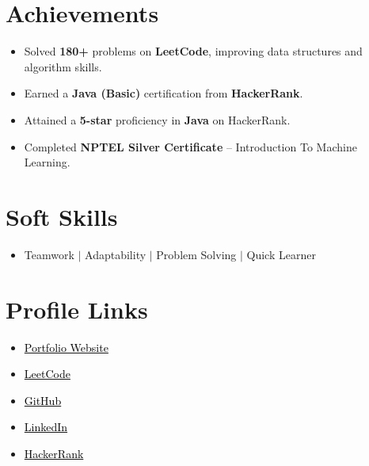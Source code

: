 \documentclass[letterpaper,11pt]{article}
\newcommand{\resumeItem}[1]{
  \item\small{
        {#1 \vspace{-2pt}}
  }
}
\newcommand{\resumeItemListStart}{\begin{itemize}}
\newcommand{\resumeItemListEnd}{\end{itemize}\vspace{-5pt}}
\begin{document}
\section{Achievements}
 \begin{itemize}[leftmargin=0in, label={}]
        \resumeItemListStart
            \resumeItem{Solved \textbf{180+} problems on \textbf{LeetCode}, improving data structures and algorithm skills.}
            \resumeItem{Earned a \textbf{Java (Basic)} certification from \textbf{HackerRank}.}
            \resumeItem{Attained a \textbf{5-star} proficiency in \textbf{Java} on HackerRank.}
            \resumeItem{Completed \textbf{NPTEL Silver Certificate} -- Introduction To Machine Learning.}
          \resumeItemListEnd
 \end{itemize}
 \vspace{-16pt}

\section{Soft Skills}
 \begin{itemize}[leftmargin=0in, label={}]
        \resumeItemListStart
            \resumeItem{Teamwork $|$ Adaptability $|$ Problem Solving $|$ Quick Learner}
          \resumeItemListEnd
 \end{itemize}
 \vspace{-16pt}

\section{Profile Links}
 \begin{itemize}[leftmargin=0in, label={}]
        \resumeItemListStart
            \resumeItem{\href{https://portfolio-gokulraj.netlify.app/}{\textcolor{black}{Portfolio Website}}}
            \resumeItem{\href{https://leetcode.com/u/Gokul_raj_n/}{\textcolor{black}{LeetCode}}}
            \resumeItem{\href{https://github.com/Gokulraj-N80}{\textcolor{black}{GitHub}}}
            \resumeItem{\href{https://www.linkedin.com/in/gokulraj-n-452438360/}{\textcolor{black}{LinkedIn}}}
            \resumeItem{\href{https://www.hackerrank.com/profile/gokulrajofficia1}{\textcolor{black}{HackerRank}}}
          \resumeItemListEnd
 \end{itemize}
 \vspace{-16pt}
\end{document}
